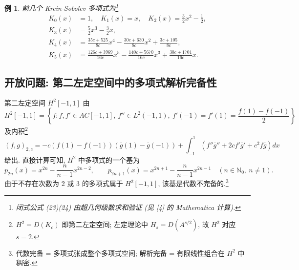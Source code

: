 \documentclass[UTF8]{ctexart}
\newtheorem{example}[theorem]{例}
\begin{document}
\begin{example}
前几个 Krein-Sobolev 多项式为\footnote{闭式公式 (23)(24) 由超几何级数求和验证 (见 [4] 的 Mathematica 计算).}
\begin{align*}
	K_0(x) &= 1, \quad K_1(x) = x, \quad K_2(x) = \frac{3}{2} x^2 - \frac{1}{2}, \\
	K_3(x) &= \frac{5}{2} x^3 - \frac{3}{2} x, \\
	K_4(x) &= \frac{35c + 525}{8c} x^4 - \frac{30c + 630}{8c} x^2
		+ \frac{3c + 105}{8c}, \\
	K_5(x) &= \frac{126c + 3969}{16c} x^5 - \frac{140c + 5670}{16c} x^3
		+ \frac{30c + 1701}{16c} x.
\end{align*}
\end{example}

\subsection{开放问题: 第二左定空间中的多项式解析完备性}

第二左定空间 $H^2[-1,1]$ 由
\begin{equation}
	H^2[-1,1] = \left\{ f : f, f' \in AC[-1,1],\ f'' \in L^2(-1,1),\
		f'(-1) = f'(1) = \frac{f(1) - f(-1)}{2} \right\}
\end{equation}
及内积\footnote{$H^2 = D(K_c)$ 即第二左定空间; 左定理论中 $H_s = D(A^{s/2})$, 故 $H^2$ 对应 $s = 2$.}
\begin{equation}
	(f, g)_{2,c} = -c (f(1) - f(-1))(\overline{g}(1) - \overline{g}(-1))
		+ \int_{-1}^{1} \left( f''\overline{g}'' + 2c f'\overline{g}' + c^2 f\overline{g} \right) dx
\end{equation}
给出. 直接计算可知, $H^2$ 中多项式的一个基为
\begin{equation}
	p_{2n}(x) = x^{2n} - \frac{n}{n-1} x^{2n-2}, \qquad
	p_{2n+1}(x) = x^{2n+1} - \frac{n}{n-1} x^{2n-1} \quad (n \in \mathbb{N}_0,\ n \neq 1).
\end{equation}
由于不存在次数为 2 或 3 的多项式属于 $H^2[-1,1]$, 该基是代数不完备的.\footnote{代数完备 = 多项式张成整个多项式空间; 解析完备 = 有限线性组合在 $H^2$ 中稠密.}
\end{document}
